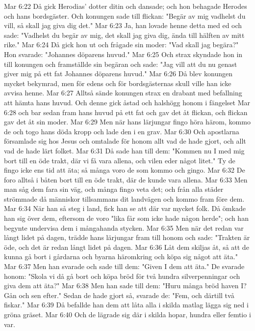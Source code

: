 Mar 6:22  Då gick Herodias' dotter ditin och dansade; och hon behagade Herodes och hans bordsgäster. Och konungen sade till flickan: "Begär av mig vadhelst du vill, så skall jag giva dig det."
Mar 6:23  Ja, han lovade henne detta med ed och sade: "Vadhelst du begär av mig, det skall jag giva dig, ända till hälften av mitt rike."
Mar 6:24  Då gick hon ut och frågade sin moder: "Vad skall jag begära?" Hon svarade: "Johannes döparens huvud."
Mar 6:25  Och strax skyndade hon in till konungen och framställde sin begäran och sade: "Jag vill att du nu genast giver mig på ett fat Johannes döparens huvud."
Mar 6:26  Då blev konungen mycket bekymrad, men för edens och för bordsgästernas skull ville han icke avvisa henne.
Mar 6:27  Alltså sände konungen strax en drabant med befallning att hämta hans huvud. Och denne gick åstad och halshögg honom i fängelset
Mar 6:28  och bar sedan fram hans huvud på ett fat och gav det åt flickan, och flickan gav det åt sin moder.
Mar 6:29  Men när hans lärjungar fingo höra härom, kommo de och togo hans döda kropp och lade den i en grav.
Mar 6:30  Och apostlarna församlade sig hos Jesus och omtalade för honom allt vad de hade gjort, och allt vad de hade lärt folket.
Mar 6:31  Då sade han till dem: "Kommen nu I med mig bort till en öde trakt, där vi få vara allena, och vilen eder något litet." Ty de fingo icke ens tid att äta; så många voro de som kommo och gingo.
Mar 6:32  De foro alltså i båten bort till en öde trakt, där de kunde vara allena.
Mar 6:33  Men man såg dem fara sin väg, och många fingo veta det; och från alla städer strömmade då människor tillsammans dit landvägen och kommo fram före dem.
Mar 6:34  När han så steg i land, fick han se att där var mycket folk. Då ömkade han sig över dem, eftersom de voro "lika får som icke hade någon herde"; och han begynte undervisa dem i mångahanda stycken.
Mar 6:35  Men när det redan var långt lidet på dagen, trädde hans lärjungar fram till honom och sade: "Trakten är öde, och det är redan långt lidet på dagen.
Mar 6:36  Låt dem skiljas åt, så att de kunna gå bort i gårdarna och byarna häromkring och köpa sig något att äta."
Mar 6:37  Men han svarade och sade till dem: "Given I dem att äta." De svarade honom: "Skola vi då gå bort och köpa bröd för två hundra silverpenningar och giva dem att äta?"
Mar 6:38  Men han sade till dem: "Huru många bröd haven I? Gån och sen efter." Sedan de hade gjort så, svarade de: "Fem, och därtill två fiskar."
Mar 6:39  Då befallde han dem att låta alla i skilda matlag lägga sig ned i gröna gräset.
Mar 6:40  Och de lägrade sig där i skilda hopar, hundra eller femtio i var.
